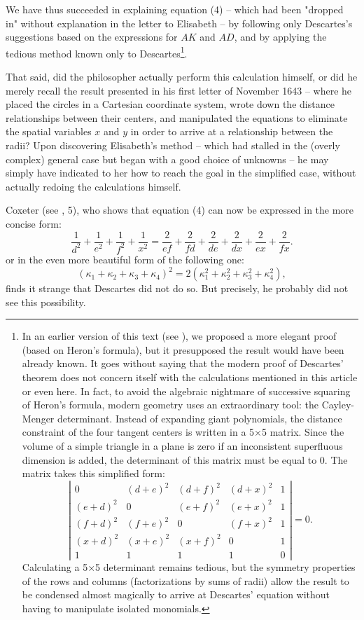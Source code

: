 \documentclass[12pt]{article}
\theoremstyle{définition}
\theoremstyle{remark}
\theoremstyle{plain}
\theoremstyle{plain}
\begin{document}
We have thus succeeded in explaining equation (4) -- which had been "dropped in" without explanation in the letter to Elisabeth -- by following only Descartes's suggestions based on the expressions for $AK$ and $AD$, and by applying the tedious method known only to Descartes\footnote{In an earlier version of this text (see \cite{Par3}), we proposed a more elegant proof (based on Heron's formula), but it presupposed the result would have been already known. It goes without saying that the modern proof of Descartes' theorem does not concern itself with the calculations mentioned in this article or even here. In fact, to avoid the algebraic nightmare of successive squaring of Heron's formula, modern geometry uses an extraordinary tool: the Cayley-Menger determinant. Instead of expanding giant polynomials, the distance constraint of the four tangent centers is written in a 5×5 matrix. Since the volume of a simple triangle in a plane is zero if an inconsistent superfluous dimension is added, the determinant of this matrix must be equal to 0. The matrix takes this simplified form:
\[
\left|\begin{matrix}0&(d+e)^{2}&(d+f)^{2}&(d+x)^{2}&1\\ (e+d)^{2}&0&(e+f)^{2}&(e+x)^{2}&1\\ (f+d)^{2}&(f+e)^{2}&0&(f+x)^{2}&1\\ (x+d)^{2}&(x+e)^{2}&(x+f)^{2}&0&1\\ 1&1&1&1&0
\end{matrix}\right|=0.
\]
Calculating a 5×5 determinant remains tedious, but the symmetry properties of the rows and columns (factorizations by sums of radii) allow the result to be condensed almost magically to arrive at Descartes' equation without having to manipulate isolated monomials.}.

That said, did the philosopher actually perform this calculation himself, or did he merely recall the result presented in his first letter of November 1643 -- where he placed the circles in a Cartesian coordinate system, wrote down the distance relationships between their centers, and manipulated the equations to eliminate the spatial variables $x$ and $y$ in order to arrive at a relationship between the radii? Upon discovering Elisabeth's method -- which had stalled in the (overly complex) general case but began with a good choice of unknowns -- he may simply have indicated to her how to reach the goal in the simplified case, without actually redoing the calculations himself.

Coxeter (see \cite{Cox}, 5), who shows that equation (4) can now be expressed in the more concise form:
\begin{equation}
\frac{1}{d^2}+ \frac{1}{e^2}+ \frac{1}{f^2}+ \frac{1}{x^2} = \frac{2}{ef}+ \frac{2}{fd}+ \frac{2}{de}+ \frac{2}{dx}+ \frac{2}{ex}+ \frac{2}{fx} .
\end{equation}
or in the even more beautiful form of the following one:
\[
(\kappa_1+\kappa_2+\kappa_3+\kappa_4)^2 = 2(\kappa_1^2+\kappa_2^2+\kappa_3^2+\kappa_4^2),
\]
finds it strange that Descartes did not do so. But precisely, he probably did not see this possibility.
\end{document}
